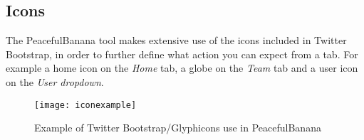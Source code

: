 \subsection{Icons}
The PeacefulBanana tool makes extensive use of the icons included in Twitter Bootstrap, in order to further define what action you can expect from a tab. For example a home icon on the \textit{Home} tab, a globe on the \textit{Team} tab and a user icon on the \textit{User dropdown}.
\begin{figure}[h!]
\centering
	\texttt{[image: iconexample]}
\caption{Example of Twitter Bootstrap/Glyphicons use in PeacefulBanana}
\label{iconexample}
\end{figure}
